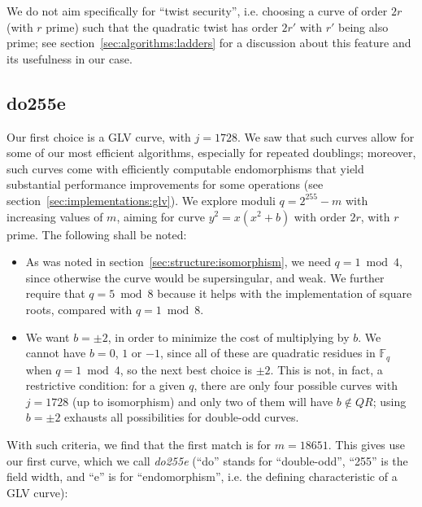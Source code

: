 \documentclass{llncs}
\newcommand{\bF}{\mathbb{F}}
\begin{document}
We do not aim specifically for ``twist security'', i.e. choosing a curve
of order $2r$ (with $r$ prime) such that the quadratic twist has order
$2r'$ with $r'$ being also prime; see section~\ref{sec:algorithms:ladders}
for a discussion about this feature and its usefulness in our case.

\subsection{do255e}\label{sec:curveparams:do255e}

Our first choice is a GLV curve, with $j = 1728$. We saw that such
curves allow for some of our most efficient algorithms, especially for
repeated doublings; moreover, such curves come with efficiently
computable endomorphisms that yield substantial performance improvements
for some operations (see section~\ref{sec:implementations:glv}). We
explore moduli $q = 2^{255}-m$ with increasing values of $m$, aiming for
curve $y^2 = x(x^2 + b)$ with order $2r$, with $r$ prime. The following
shall be noted:
\begin{itemize}

    \item As was noted in section~\ref{sec:structure:isomorphism}, we
    need $q = 1\bmod 4$, since otherwise the curve would be
    supersingular, and weak. We further require that $q = 5\bmod 8$
    because it helps with the implementation of square roots, compared
    with $q = 1\bmod 8$.

    \item We want $b = \pm 2$, in order to minimize the cost of multiplying
    by $b$. We cannot have $b = 0$, $1$ or $-1$, since all of these are
    quadratic residues in $\bF_q$ when $q = 1\bmod 4$, so the next best
    choice is $\pm 2$. This is not, in fact, a restrictive condition:
    for a given $q$, there are only four possible curves with $j = 1728$
    (up to isomorphism) and only two of them will have $b \notin QR$;
    using $b = \pm 2$ exhausts all possibilities for double-odd curves.

\end{itemize}

With such criteria, we find that the first match is for $m = 18651$.
This gives use our first curve, which we call \emph{do255e} (``do''
stands for ``double-odd'', ``255'' is the field width, and ``e'' is for
``endomorphism'', i.e. the defining characteristic of a GLV curve):
\end{document}
